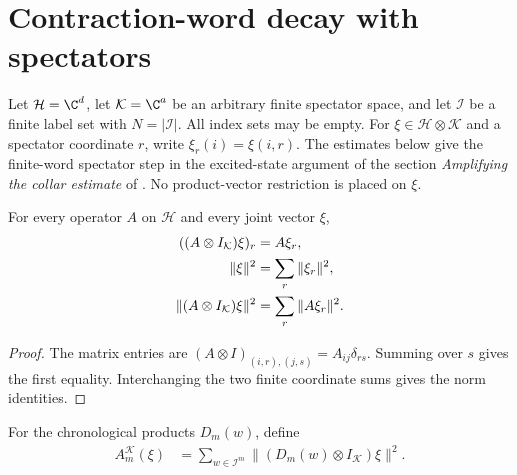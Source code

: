 \section{Contraction-word decay with spectators}
\label{sec:contraction_word_decay_spectator}

Let $\mathcal H=\C^d$, let $\mathcal K=\C^a$ be an arbitrary finite
spectator space, and let $\mathcal I$ be a finite label set with $N=|\mathcal I|$. All index
sets may be empty. For
$\xi\in\mathcal H\otimes\mathcal K$ and a spectator coordinate $r$, write
$\xi_r(i)=\xi(i,r)$. The estimates below give the finite-word spectator
step in the excited-state argument of
the section \emph{Amplifying the collar estimate} of
\cite{OpenAI2026AreaLaw}. No product-vector restriction is
placed on $\xi$.

\begin{theorem}
    \label{thm:contraction_spectator_slices}
    \leanok
    For every operator $A$ on $\mathcal H$ and every joint vector $\xi$,
    \begin{align}
        ((A\otimes I_{\mathcal K})\xi)_r & = A\xi_r,
        \label{eq:contraction_spectator_slices}\\
        \|\xi\|^2 & = \sum_r\|\xi_r\|^2, \notag\\
        \|(A\otimes I_{\mathcal K})\xi\|^2 & = \sum_r\|A\xi_r\|^2. \notag
    \end{align}
\end{theorem}
\begin{proof}
    \leanok
    The matrix entries are $(A\otimes I)_{(i,r),(j,s)}=A_{ij}\delta_{rs}$.
    Summing over $s$ gives the first equality. Interchanging the two
    finite coordinate sums gives the norm identities.
\end{proof}

\begin{definition}
    \label{def:contraction_spectator_sum}
    \leanok
    For the chronological products $D_m(w)$, define
    \begin{align}
        A_m^{\mathcal K}(\xi)
         & =\sum_{w\in\mathcal I^m}\|(D_m(w)\otimes I_{\mathcal K})\xi\|^2.
        \label{eq:contraction_spectator_energy}
    \end{align}
\end{definition}

